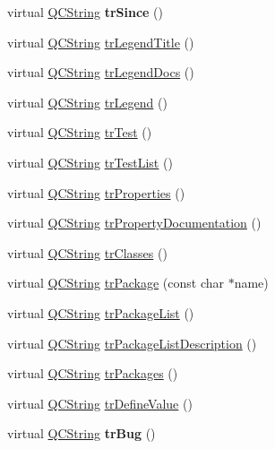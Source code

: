\begin{DoxyCompactItemize}
\item 
\hypertarget{class_translator_chinese_a8a54ef0002d14b977e834ac617ef1ec4}{virtual \hyperlink{class_q_c_string}{Q\-C\-String} {\bfseries tr\-Since} ()}\label{class_translator_chinese_a8a54ef0002d14b977e834ac617ef1ec4}

\item 
virtual \hyperlink{class_q_c_string}{Q\-C\-String} \hyperlink{class_translator_chinese_aa2e21c96b9e0a4faa8c0fbc7680e7f6d}{tr\-Legend\-Title} ()
\item 
virtual \hyperlink{class_q_c_string}{Q\-C\-String} \hyperlink{class_translator_chinese_a44f93b0cf98795f6dde19db558d24534}{tr\-Legend\-Docs} ()
\item 
virtual \hyperlink{class_q_c_string}{Q\-C\-String} \hyperlink{class_translator_chinese_a1c0e494dddb7980e1c9ce898105f09c2}{tr\-Legend} ()
\item 
virtual \hyperlink{class_q_c_string}{Q\-C\-String} \hyperlink{class_translator_chinese_a26cdb0ae212a40b38ab30c239d0e1ec1}{tr\-Test} ()
\item 
virtual \hyperlink{class_q_c_string}{Q\-C\-String} \hyperlink{class_translator_chinese_a4aca73ae6d7e7a204eccd20e7f87a68d}{tr\-Test\-List} ()
\item 
virtual \hyperlink{class_q_c_string}{Q\-C\-String} \hyperlink{class_translator_chinese_a28f852553c146863a0b8ce5a215a9a1f}{tr\-Properties} ()
\item 
virtual \hyperlink{class_q_c_string}{Q\-C\-String} \hyperlink{class_translator_chinese_aa7f233a7014c4b561ebbedc8b76a7bd8}{tr\-Property\-Documentation} ()
\item 
virtual \hyperlink{class_q_c_string}{Q\-C\-String} \hyperlink{class_translator_chinese_a4bc1d444e897ace8e0e1e75590b879d3}{tr\-Classes} ()
\item 
virtual \hyperlink{class_q_c_string}{Q\-C\-String} \hyperlink{class_translator_chinese_a071fcb3177ebad975ba6f5931439b3ee}{tr\-Package} (const char $\ast$name)
\item 
virtual \hyperlink{class_q_c_string}{Q\-C\-String} \hyperlink{class_translator_chinese_a777a67065ae7cc0fd32c0620ea1d3fdb}{tr\-Package\-List} ()
\item 
virtual \hyperlink{class_q_c_string}{Q\-C\-String} \hyperlink{class_translator_chinese_aafd776ddbb24f5b3cf7c2f39c80f8652}{tr\-Package\-List\-Description} ()
\item 
virtual \hyperlink{class_q_c_string}{Q\-C\-String} \hyperlink{class_translator_chinese_a5b648094fc927e3078e9af28c26f8bba}{tr\-Packages} ()
\item 
virtual \hyperlink{class_q_c_string}{Q\-C\-String} \hyperlink{class_translator_chinese_ae6be6e403011f5b069dde07447839f9e}{tr\-Define\-Value} ()
\item 
\hypertarget{class_translator_chinese_abfa1d6c97f4c2967ebbd515db5590ec6}{virtual \hyperlink{class_q_c_string}{Q\-C\-String} {\bfseries tr\-Bug} ()}\label{class_translator_chinese_abfa1d6c97f4c2967ebbd515db5590ec6}


\end{DoxyCompactItemize}

